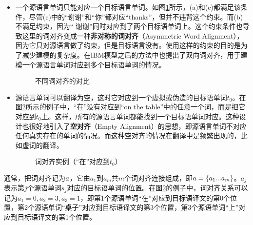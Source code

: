 \begin{itemize}
\vspace{0.5em}
\item 一个源语言单词只能对应一个目标语言单词。如图\ref{fig:5-15}所示，(a)和(c)都满足该条件，尽管(c)中的“谢谢”和“你”都对应“thanks”，但并不违背这个约束。而(b)不满足约束，因为“ 谢谢”同时对应到了两个目标语单词上。这个约束条件也导致这里的词对齐变成一种{\small\sffamily\bfseries{非对称的词对齐}}（Asymmetric Word Alignment），因为它只对源语言做了约束，但是目标语言没有。使用这样的约束的目的是为了减少建模的复杂度。在IBM模型之后的方法中也提出了双向词对齐，用于建模一个源语言单词对应到多个目标语单词的情况。

\begin{figure}[htp]
    \centering

\setlength{\belowcaptionskip}{-0.5em}
    \caption{不同词对齐的对比}
    \label{fig:5-15}
\end{figure}

\item 源语言单词可以翻译为空，这时它对应到一个虚拟或伪造的目标语单词$t_0$。在图\ref{fig:5-16}所示的例子中，“在”没有对应到“on the table”中的任意一个词，而是把它对应到$t_0$上。这样，所有的源语言单词都能找到一个目标语单词对应。这种设计也很好地引入了{\small\sffamily\bfseries{空对齐}}（Empty Alignment）的思想，即源语言单词不对应任何真实存在的单词的情况。而这种空对齐的情况在翻译中是频繁出现的，比如虚词的翻译。

\begin{figure}[htp]
    \centering

\setlength{\belowcaptionskip}{-0.5em}
    \caption{词对齐实例（“在”对应到$t_0$）}
    \label{fig:5-16}
\end{figure}
\end{itemize}

\parinterval 通常，把词对齐记为${a}$，它由$a_1$到$a_m$共$m$个词对齐连接组成，即${a}=\{ a_1...a_m \}$。$a_j$表示第$j$个源语单词$s_j$对应的目标语单词的位置。在图\ref{fig:5-16}的例子中，词对齐关系可以记为$a_1=0, a_2=3, a_3=1$，即第1个源语单词“在”对应到目标语译文的第0个位置，第2个源语单词“桌子”对应到目标语译文的第3个位置，第3个源语单词“上”对应到目标语译文的第1个位置。

